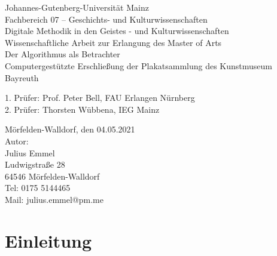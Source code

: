 \documentclass[a4paper,12pt,ngerman]{article}
\begin{document}
	\begin{titlepage}
	\begin{singlespace}
		\begin{center}	
			{\large Johannes-Gutenberg-Universität Mainz}\\
			\vspace{0.5cm}
			{\large Fachbereich 07 – Geschichts- und Kulturwissenschaften}\\
			\vspace{0.5cm}
			{\large Digitale Methodik in den Geistes - und Kulturwissenschaften}\\
			\vspace{1cm}
			{\large Wissenschaftliche Arbeit zur Erlangung des Master of Arts}\\
			\vspace{2cm}
			{\Huge Der Algorithmus als Betrachter \\ Computergestützte Erschließung der Plakatsammlung des Kunstmuseum Bayreuth}\\
			\vspace{2cm}
		\end{center}
			{\large 1. Prüfer: Prof. Peter Bell,  FAU Erlangen Nürnberg}\\
			{\large 2. Prüfer: Thorsten Wübbena, IEG Mainz}\\
			\vspace{2cm}
		\begin{flushright}
			{\large Mörfelden-Walldorf, den 04.05.2021}\\
			\vspace{0.5cm}
			{\large Autor: \\ Julius Emmel \\ Ludwigstraße 28 \\ 64546 Mörfelden-Walldorf}\\
			\vspace{0.5cm}
			{\large Tel: 0175 5144465 \\ Mail: julius.emmel@pm.me}
		\end{flushright}
	\restoregeometry
	\end{singlespace}
	\end{titlepage}

\newpage

\thispagestyle{empty}
\tableofcontents

\newpage

\section{Einleitung}
\end{document}
